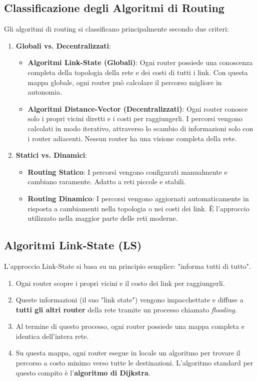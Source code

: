 \subsection{Classificazione degli Algoritmi di Routing}
Gli algoritmi di routing si classificano principalmente secondo due criteri:
\begin{enumerate}
    \item \textbf{Globali vs. Decentralizzati}:
    \begin{itemize}
        \item \textbf{Algoritmi Link-State (Globali)}: Ogni router possiede una conoscenza completa della topologia della rete e dei costi di tutti i link. Con questa mappa globale, ogni router può calcolare il percorso migliore in autonomia.
        \item \textbf{Algoritmi Distance-Vector (Decentralizzati)}: Ogni router conosce solo i propri vicini diretti e i costi per raggiungerli. I percorsi vengono calcolati in modo iterativo, attraverso lo scambio di informazioni solo con i router adiacenti. Nessun router ha una visione completa della rete.
    \end{itemize}
    \item \textbf{Statici vs. Dinamici}:
    \begin{itemize}
        \item \textbf{Routing Statico}: I percorsi vengono configurati manualmente e cambiano raramente. Adatto a reti piccole e stabili.
        \item \textbf{Routing Dinamico}: I percorsi vengono aggiornati automaticamente in risposta a cambiamenti nella topologia o nei costi dei link. È l'approccio utilizzato nella maggior parte delle reti moderne.
    \end{itemize}
\end{enumerate}

\subsection{Algoritmi Link-State (LS)}
L'approccio Link-State si basa su un principio semplice: "informa tutti di tutto".
\begin{enumerate}
    \item Ogni router scopre i propri vicini e il costo dei link per raggiungerli.
    \item Queste informazioni (il suo "link state") vengono impacchettate e diffuse a \textbf{tutti gli altri router} della rete tramite un processo chiamato \textit{flooding}.
    \item Al termine di questo processo, ogni router possiede una mappa completa e identica dell'intera rete.
    \item Su questa mappa, ogni router esegue in locale un algoritmo per trovare il percorso a costo minimo verso tutte le destinazioni. L'algoritmo standard per questo compito è l'\textbf{algoritmo di Dijkstra}.
\end{enumerate}

